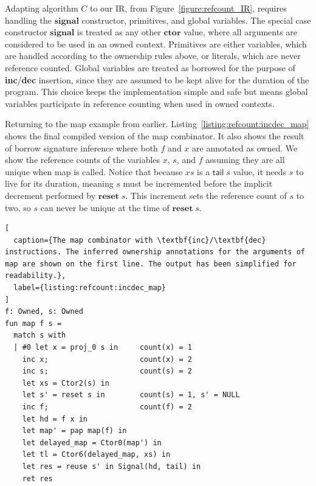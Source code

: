 Adapting algorithm $C$ to our IR, from Figure~\ref{figure:refcount_IR}, requires handling the $\mathbf{signal}$ constructor, primitives, and global variables. 
The special case constructor $\mathbf{signal}$ is treated as any other $\mathbf{ctor}$ value, where all arguments are considered to be used in an owned context.
Primitives are either variables, which are handled according to the ownership rules above, or literals, which are never reference counted.
Global variables are treated as borrowed for the purpose of \textbf{inc}/\textbf{dec} insertion, since they are assumed to be kept alive for the duration of the program. This choice keeps the implementation simple and safe but means global variables participate in reference counting when used in owned contexts.

Returning to the map example from earlier. Listing~\ref{listing:refcount:incdec_map} shows the final compiled version of the map combinator.
It also shows the result of borrow signature inference where both $f$ and $x$ are annotated as owned. We show the reference counts of the variables $x$, $s$, and $f$ assuming they are all unique when map is called. 
Notice that because $xs$ is a $\mathsf{tail} \; s$ value, it needs $s$ to live for its duration, meaning $s$ must be incremented before the implicit decrement performed by $\mathbf{reset} \; s$. 
This increment sets the reference count of $s$ to two, so $s$ can never be unique at the time of $\mathbf{reset} \; s$.

\begin{lstlisting}[
  caption={The map combinator with \textbf{inc}/\textbf{dec} instructions. The inferred ownership annotations for the arguments of map are shown on the first line. The output has been simplified for readability.},
  label={listing:refcount:incdec_map}
]
f: Owned, s: Owned
fun map f s =
  match s with  
  | #0 let x = proj_0 s in     count(x) = 1
    inc x;                     count(x) = 2
    inc s;                     count(s) = 2
    let xs = Ctor2(s) in
    let s' = reset s in        count(s) = 1, s' = NULL
    inc f;                     count(f) = 2
    let hd = f x in
    let map' = pap map(f) in
    let delayed_map = Ctor0(map') in
    let tl = Ctor6(delayed_map, xs) in    
    let res = reuse s' in Signal(hd, tail) in
    ret res
\end{lstlisting}


